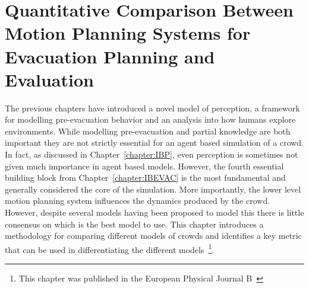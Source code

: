 
\chapter{Quantitative Comparison Between Motion Planning Systems for Evacuation Planning and Evaluation}
\label{chapter:MotionPlannerComparison}

The previous chapters have introduced a novel model of perception, a framework for modelling pre-evacuation behavior and an analysis into how humans explore environments. While modelling pre-evacuation and partial knowledge are both important they are not strictly essential for an agent based simulation of a crowd. In fact, as discussed in Chapter~\ref{chapter:IBP}, even perception is sometimes not given much importance in agent based models. However, the fourth essential building block from Chapter~\ref{chapter:IBEVAC} is the most fundamental and generally considered the core of the simulation. More importantly, the lower level motion planning system influences the dynamics produced by the crowd. However, despite several models having been proposed to model this there is little consensus on which is the best model to use. This chapter introduces a methodology for comparing different models of crowds and identifies a key metric that can be used in differentiating the different models~\footnote{This chapter was published in the European Physical Journal B~\cite{Viswanathan2014}}.

%

